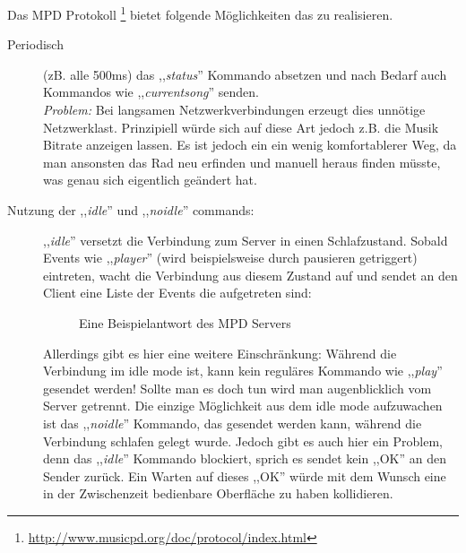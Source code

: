 Das MPD Protokoll \footnote{\url{http://www.musicpd.org/doc/protocol/index.html}} bietet folgende Möglichkeiten das zu realisieren.
\begin{description}
    \item [Periodisch] (zB. alle 500ms) das ,,\textit{status}'' Kommando absetzen und nach Bedarf auch Kommandos wie ,,\textit{currentsong}''
        senden.
        \\
        \emph{Problem:} Bei langsamen Netzwerkverbindungen erzeugt dies unnötige Netzwerklast. 
        Prinzipiell würde sich auf diese Art jedoch z.B. die Musik Bitrate anzeigen lassen. Es ist jedoch ein ein wenig
        komfortablerer Weg, da man ansonsten das Rad neu erfinden und manuell heraus finden müsste, 
        was genau sich eigentlich geändert hat.
    \item [Nutzung der ,,\textit{idle}'' und ,,\textit{noidle}'' commands:]
        ,,\textit{idle}'' versetzt die Verbindung zum Server in einen Schlafzustand. Sobald Events wie ,,\textit{player}'' (wird beispielsweise durch pausieren getriggert) 
        eintreten, wacht die Verbindung aus diesem Zustand auf und sendet an den Client eine Liste der Events die aufgetreten sind:

	\begin{figure}[h!]
	  
	  \caption{Eine Beispielantwort des MPD Servers}
	  \label{dd_state}
	\end{figure}

        Allerdings gibt es hier eine weitere Einschränkung: Während die Verbindung im idle mode ist, kann kein reguläres Kommando wie ,,\textit{play}'' gesendet werden!
        Sollte man es doch tun wird man augenblicklich vom Server getrennt.
        Die einzige Möglichkeit aus dem idle mode aufzuwachen ist das ,,\textit{noidle}'' Kommando, das gesendet werden
        kann, während die Verbindung schlafen gelegt wurde.
        Jedoch gibt es auch hier ein Problem, denn das ,,\textit{idle}'' Kommando blockiert, sprich es sendet kein ,,OK'' an den  Sender zurück.
        Ein Warten auf dieses ,,OK'' würde mit dem Wunsch eine in der Zwischenzeit bedienbare Oberfläche zu haben kollidieren.
\end{description}

